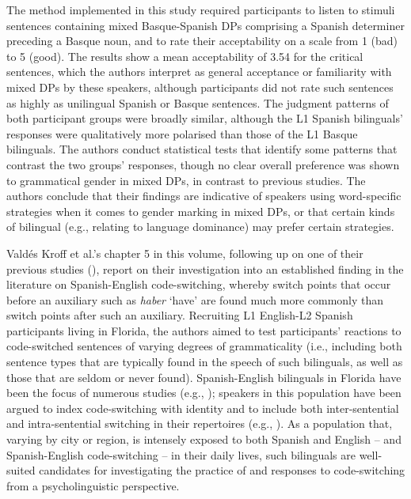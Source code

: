 \documentclass[output=paper]{langscibook}
\begin{document}
The method implemented in this study required participants to listen to stimuli sentences containing mixed Basque-Spanish DPs comprising a Spanish determiner preceding a Basque noun, and to rate their acceptability on a scale from 1 (bad) to 5 (good). The results show a mean acceptability of 3.54 for the critical sentences, which the authors interpret as general acceptance or familiarity with mixed DPs by these speakers, although participants did not rate such sentences as highly as unilingual Spanish or Basque sentences. The judgment patterns of both participant groups were broadly similar, although the L1 Spanish bilinguals’ responses were qualitatively more polarised than those of the L1 Basque bilinguals. The authors conduct statistical tests that identify some patterns that contrast the two groups’ responses, though no clear overall preference was shown to grammatical gender in mixed DPs, in contrast to previous studies. The authors conclude that their findings are indicative of speakers using word-specific strategies when it comes to gender marking in mixed DPs, or that certain kinds of bilingual (e.g., relating to language dominance) may prefer certain strategies.

Valdés Kroff et al.’s chapter 5 in this volume, following up on one of their  previous studies (\citealt{ValdésKroffEtAl2017}), report on their investigation into an established finding in the literature on Spanish-English code-switching, whereby switch points that occur before an auxiliary such as \textit{haber} ‘have’ are found much more commonly than switch points after such an auxiliary. Recruiting L1 English-L2 Spanish participants living in Florida, the authors aimed to test participants’ reactions to code-switched sentences of varying degrees of grammaticality (i.e., including both sentence types that are typically found in the speech of such bilinguals, as well as those that are seldom or never found). Spanish-English bilinguals in Florida have been the focus of numerous studies (e.g., \citealt{ParafitaCoutoEtAl2011,ParafitaCoutoEtAl2013}); speakers in this population have been argued to index code-switching with identity and to include both inter-sentential and intra-sentential switching in their repertoires (e.g., \citealt{CarterEtAl2011}). As a population that, varying by city or region, is intensely exposed to both Spanish and English – and Spanish-English code-switching – in their daily lives, such bilinguals are well-suited candidates for investigating the practice of and responses to code-switching from a psycholinguistic perspective.
\end{document}
